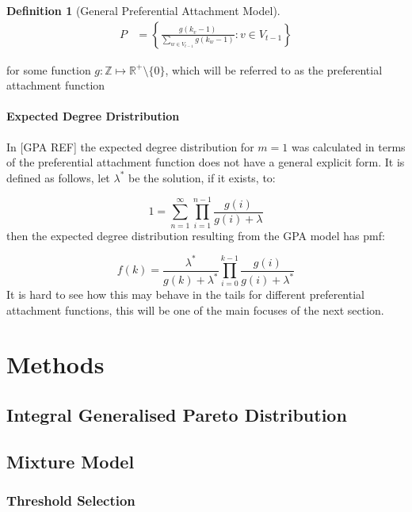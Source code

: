 \documentclass[
  10pt,
  a4paper,
]{scrreprt}
\theoremstyle{plain}
\theoremstyle{definition}
\newtheorem{definition}{Definition}[section]
\theoremstyle{remark}
\begin{document}
{\begin{definition}[General Preferential Attachment
Model]
\begin{align*}
P &= \left\{\frac{g(k_v-1)}{\sum_{w\in V_{t-1}} g(k_w-1)} : v \in V_{t-1}\right\}
\end{align*}

for some function \(g: \mathbb Z \mapsto \mathbb R^+\setminus\{0\}\),
which will be referred to as the preferential attachment function

\end{definition}

\hypertarget{expected-degree-dristribution}{%
\subsubsection{Expected Degree
Dristribution}\label{expected-degree-dristribution}}

In {[}GPA REF{]} the expected degree distribution for \(m=1\) was
calculated in terms of the preferential attachment function does not
have a general explicit form. It is defined as follows, let
\(\lambda^*\) be the solution, if it exists, to:

\[
1=\sum_{n=1}^\infty \prod_{i=1}^{n-1}\frac{g(i)}{g(i)+\lambda}
\] then the expected degree distribution resulting from the GPA model
has pmf:

\[
f(k) = \frac{\lambda^*}{g(k) + \lambda^*}\prod_{i=0}^{k-1}\frac{g(i)}{g(i)+\lambda^*}
\] It is hard to see how this may behave in the tails for different
preferential attachment functions, this will be one of the main focuses
of the next section.

\hypertarget{sec-meth}{%
\chapter{Methods}\label{sec-meth}}

\hypertarget{integral-generalised-pareto-distribution}{%
\section{Integral Generalised Pareto
Distribution}\label{integral-generalised-pareto-distribution}}

\hypertarget{mixture-model}{%
\section{Mixture Model}\label{mixture-model}}

\hypertarget{threshold-selection}{%
\subsection{Threshold Selection}\label{threshold-selection}}

}
\end{document}

